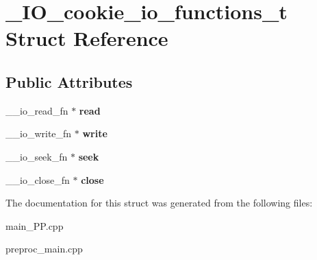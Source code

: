 \hypertarget{struct__IO__cookie__io__functions__t}{\section{\+\_\+\+I\+O\+\_\+cookie\+\_\+io\+\_\+functions\+\_\+t Struct Reference}
\label{struct__IO__cookie__io__functions__t}
}
\subsection*{Public Attributes}
\begin{DoxyCompactItemize}
\item 
\hypertarget{struct__IO__cookie__io__functions__t_a71a4b2df8d8e311bb581254df7d9c08f}{\+\_\+\+\_\+io\+\_\+read\+\_\+fn $\ast$ {\bfseries read}}\label{struct__IO__cookie__io__functions__t_a71a4b2df8d8e311bb581254df7d9c08f}

\item 
\hypertarget{struct__IO__cookie__io__functions__t_a55b08c19bcac6cbc9c61de1de18209c8}{\+\_\+\+\_\+io\+\_\+write\+\_\+fn $\ast$ {\bfseries write}}\label{struct__IO__cookie__io__functions__t_a55b08c19bcac6cbc9c61de1de18209c8}

\item 
\hypertarget{struct__IO__cookie__io__functions__t_a3a1d7e65f762f73024a06636375a71ef}{\+\_\+\+\_\+io\+\_\+seek\+\_\+fn $\ast$ {\bfseries seek}}\label{struct__IO__cookie__io__functions__t_a3a1d7e65f762f73024a06636375a71ef}

\item 
\hypertarget{struct__IO__cookie__io__functions__t_a6990aac8daca5edbe3b9010ef23401e4}{\+\_\+\+\_\+io\+\_\+close\+\_\+fn $\ast$ {\bfseries close}}\label{struct__IO__cookie__io__functions__t_a6990aac8daca5edbe3b9010ef23401e4}

\end{DoxyCompactItemize}


The documentation for this struct was generated from the following files\+:\begin{DoxyCompactItemize}
\item 
main\+\_\+\+P\+P.\+cpp\item 
preproc\+\_\+main.\+cpp\end{DoxyCompactItemize}
